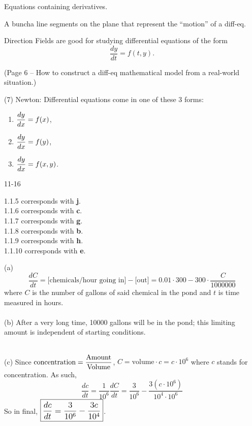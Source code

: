 \documentclass[../../diff_eqs.tex]{subfiles}
\begin{document}
\begin{definition}
    Equations containing derivatives.
\end{definition}

\begin{definition}
    A buncha line segments on the plane that represent the ``motion'' of a diff-eq.
\end{definition}

Direction Fields are good for studying differential equations of the form $$\frac{dy}{dt} = f(t, y)\text{.}$$

(Page 6 -- How to construct a diff-eq mathematical model from a real-world situation.)

(7) Newton: Differential equations come in one of these 3 forms:
\begin{enumerate}
    \item $\mathlarger{ \frac{dy}{dx} = f(x) }$,
    \item $\mathlarger{ \frac{dy}{dx} = f(y) }$,
    \item $\mathlarger{ \frac{dy}{dx} = f(x, y) }$.
\end{enumerate}


\hr

\begin{exercise}{11-16}

    1.1.5 corresponds with \textbf{j}. \\
    1.1.6 corresponds with \textbf{c}.   \\
    1.1.7 corresponds with \textbf{g}.   \\
    1.1.8 corresponds with \textbf{b}.   \\
    1.1.9 corresponds with \textbf{h}.   \\
    1.1.10 corresponds with \textbf{e}.
\end{exercise}

\begin{exercise}{17}

    (a) $$\frac{dC}{dt} = \text{[chemicals/hour going in]} - \text{[out]} = 0.01 \cdot 300 - 300 \cdot \frac{C}{1000000}$$ where $C$ is the number of gallons of said chemical in the pond and $t$ is time measured in hours. \\ 

    \phantom \\ 

    (b) After a very long time, 10000 gallons will be in the pond; this limiting amount is independent of starting conditions. 

    \phantom \\ 

    (c) Since $\mathlarger{ \text{concentration} = \frac{\text{Amount}}{\text{Volume}} }$, $C = \text{volume} \cdot c = c\cdot 10^6$ where $c$ stands for concentration. As such, $$\frac{dc}{dt} = \frac{1}{10^6} \frac{dC}{dt} = \frac{3}{10^6} - \frac{3(c \cdot 10^6)}{10^4 \cdot 10^6}$$
    So in final, $\boxed{\mathlarger{\frac{dc}{dt} = \frac{3}{10^6} - \frac{3c}{10^4}}}$.
\end{exercise}
\end{document}
